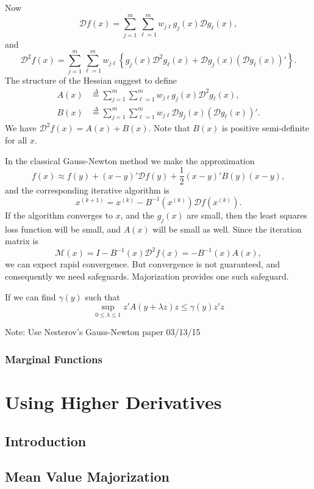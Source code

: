 \documentclass[
  12pt,
]{book}
\begin{document}
Now
\[
\mathcal{D}f(x)=\sum_{j=1}^m\sum_{\ell=1}^m w_{j\ell}g_j(x)\mathcal{D}g_\ell(x),
\]
and
\[
\mathcal{D}^2f(x)=\sum_{j=1}^m\sum_{\ell=1}^m w_{j\ell}\left\{g_j(x)\mathcal{D}^2g_\ell(x)+\mathcal{D}g_j(x)(\mathcal{D}g_\ell(x))'\right\}.
\]
The structure of the Hessian suggest to define
\begin{align*}
A(x)&\mathop{=}\limits^{\Delta}\sum_{j=1}^m\sum_{\ell=1}^m w_{j\ell}g_j(x)\mathcal{D}^2g_\ell(x),\\
B(x)&\mathop{=}\limits^{\Delta}\sum_{j=1}^m\sum_{\ell=1}^m w_{j\ell}\mathcal{D}g_j(x)(\mathcal{D}g_\ell(x))'.
\end{align*}
We have \(\mathcal{D}^2f(x)=A(x)+B(x)\). Note that \(B(x)\) is positive semi-definite for all \(x\).

In the classical Gauss-Newton method we make the approximation
\[
f(x)\approx f(y)+(x-y)'\mathcal{D}f(y)+\frac12 (x-y)'B(y)(x-y),
\]
and the corresponding iterative algorithm is
\[
x^{(k+1)}=x^{(k)}-B^{-1}(x^{(k)})\mathcal{D}f(x^{(k)}).
\]
If the algorithm converges to \(x\), and the \(g_j(x)\) are small, then the least squares loss function will be small,
and \(A(x)\) will be small as well. Since the iteration matrix is
\[
\mathcal{M}(x)=I-B^{-1}(x)\mathcal{D}^2f(x)=-B^{-1}(x)A(x),
\]
we can expect rapid convergence. But convergence is not guaranteed, and consequently we need safeguards. Majorization provides one such safeguard.

If we can find \(\gamma(y)\) such that
\[
\sup_{0\leq\lambda\leq 1}z'A(y+\lambda z)z\leq\gamma(y)z'z
\]

Note: Use Nesterov's Gauss-Newton paper 03/13/15

\hypertarget{marginal-functions}{%
\subsection{Marginal Functions}\label{marginal-functions}}

\hypertarget{using-higher-derivatives}{%
\chapter{Using Higher Derivatives}\label{using-higher-derivatives}}

\hypertarget{introduction-5}{%
\section{Introduction}\label{introduction-5}}

\hypertarget{mean-value-majorization}{%
\section{Mean Value Majorization}\label{mean-value-majorization}}
\end{document}
